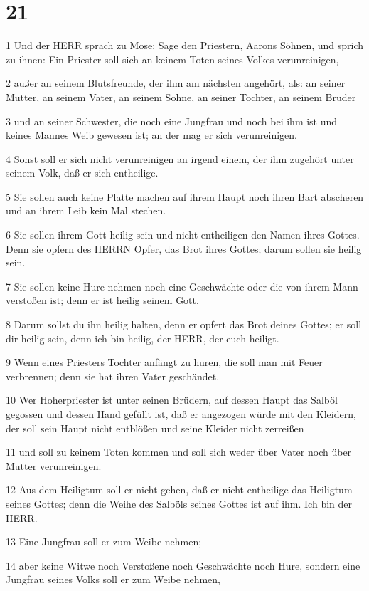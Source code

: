 \chapter{21}

\par 1 Und der HERR sprach zu Mose: Sage den Priestern, Aarons Söhnen, und sprich zu ihnen: Ein Priester soll sich an keinem Toten seines Volkes verunreinigen,
\par 2 außer an seinem Blutsfreunde, der ihm am nächsten angehört, als: an seiner Mutter, an seinem Vater, an seinem Sohne, an seiner Tochter, an seinem Bruder
\par 3 und an seiner Schwester, die noch eine Jungfrau und noch bei ihm ist und keines Mannes Weib gewesen ist; an der mag er sich verunreinigen.
\par 4 Sonst soll er sich nicht verunreinigen an irgend einem, der ihm zugehört unter seinem Volk, daß er sich entheilige.
\par 5 Sie sollen auch keine Platte machen auf ihrem Haupt noch ihren Bart abscheren und an ihrem Leib kein Mal stechen.
\par 6 Sie sollen ihrem Gott heilig sein und nicht entheiligen den Namen ihres Gottes. Denn sie opfern des HERRN Opfer, das Brot ihres Gottes; darum sollen sie heilig sein.
\par 7 Sie sollen keine Hure nehmen noch eine Geschwächte oder die von ihrem Mann verstoßen ist; denn er ist heilig seinem Gott.
\par 8 Darum sollst du ihn heilig halten, denn er opfert das Brot deines Gottes; er soll dir heilig sein, denn ich bin heilig, der HERR, der euch heiligt.
\par 9 Wenn eines Priesters Tochter anfängt zu huren, die soll man mit Feuer verbrennen; denn sie hat ihren Vater geschändet.
\par 10 Wer Hoherpriester ist unter seinen Brüdern, auf dessen Haupt das Salböl gegossen und dessen Hand gefüllt ist, daß er angezogen würde mit den Kleidern, der soll sein Haupt nicht entblößen und seine Kleider nicht zerreißen
\par 11 und soll zu keinem Toten kommen und soll sich weder über Vater noch über Mutter verunreinigen.
\par 12 Aus dem Heiligtum soll er nicht gehen, daß er nicht entheilige das Heiligtum seines Gottes; denn die Weihe des Salböls seines Gottes ist auf ihm. Ich bin der HERR.
\par 13 Eine Jungfrau soll er zum Weibe nehmen;
\par 14 aber keine Witwe noch Verstoßene noch Geschwächte noch Hure, sondern eine Jungfrau seines Volks soll er zum Weibe nehmen,

